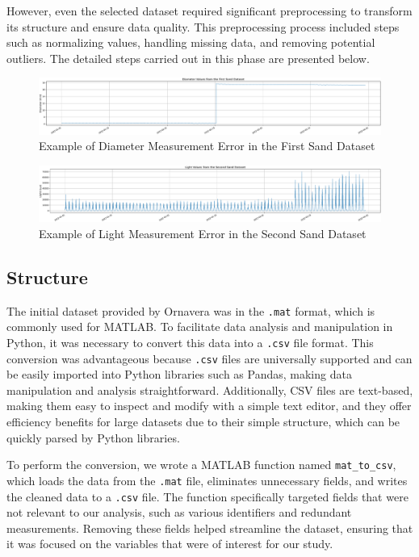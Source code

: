 However, even the selected dataset required significant preprocessing to transform its structure and ensure data quality. This preprocessing process included steps such as normalizing values, handling missing data, and removing potential outliers. The detailed steps carried out in this phase are presented below.

\begin{figure}[htbp]
    \centering
    \includegraphics[width=15 cm]{5_ChapterDesign/figuras/1_DatasetIssues/Diameter_Sand_1}
    \caption{Example of Diameter Measurement Error in the First Sand Dataset}
    \label{Diameter_Sand_1}
\end{figure}

\begin{figure}[htbp]
    \centering
    \includegraphics[width=15 cm]{5_ChapterDesign/figuras/1_DatasetIssues/Light_Sand_2}
    \caption{Example of Light Measurement Error in the Second Sand Dataset}
    \label{Light_Sand_2}
\end{figure}


\subsection{Structure}

The initial dataset provided by Ornavera was in the \texttt{.mat} format, which is commonly used for MATLAB. To facilitate data analysis and manipulation in Python, it was necessary to convert this data into a \texttt{.csv} file format. This conversion was advantageous because \texttt{.csv} files are universally supported and can be easily imported into Python libraries such as Pandas, making data manipulation and analysis straightforward. Additionally, CSV files are text-based, making them easy to inspect and modify with a simple text editor, and they offer efficiency benefits for large datasets due to their simple structure, which can be quickly parsed by Python libraries.

To perform the conversion, we wrote a MATLAB function named \texttt{mat\_to\_csv}, which loads the data from the \texttt{.mat} file, eliminates unnecessary fields, and writes the cleaned data to a \texttt{.csv} file. The function specifically targeted fields that were not relevant to our analysis, such as various identifiers and redundant measurements. Removing these fields helped streamline the dataset, ensuring that it was focused on the variables that were of interest for our study.

